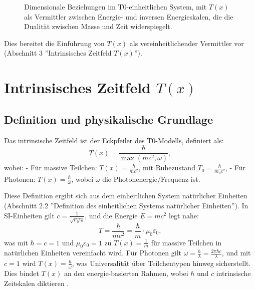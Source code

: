 \documentclass[12pt,a4paper]{article}
\newcommand{\Tfield}{T(x)}
\newcommand{\Tzero}{T_0}
\begin{document}
	\begin{figure}[ht]
		\centering
		\caption{Dimensionale Beziehungen im T0-einheitlichen System, mit \(\Tfield\) als Vermittler zwischen Energie- und inversen Energieskalen, die die Dualität zwischen Masse und Zeit widerspiegelt.}
		\label{fig:dimensions}
	\end{figure}
	
	Dies bereitet die Einführung von \(\Tfield\) als vereinheitlichender Vermittler vor (Abschnitt 3 ''Intrinsisches Zeitfeld \(\Tfield\)'').
	
	\section{Intrinsisches Zeitfeld \(\Tfield\)}
	\label{sec:intrinsic_time}
	
	\subsection{Definition und physikalische Grundlage}
	\label{subsec:time_definition}
	
	Das intrinsische Zeitfeld ist der Eckpfeiler des T0-Modells, definiert als:
	\begin{equation}
		\Tfield = \frac{\hbar}{\max(mc^2, \omega)},
		\label{eq:intrinsic_time}
	\end{equation}
	wobei:
	- Für massive Teilchen: \(\Tfield = \frac{\hbar}{mc^2}\), mit Ruhezustand \(\Tzero = \frac{\hbar}{m_0 c^2}\),
	- Für Photonen: \(\Tfield = \frac{\hbar}{\omega}\), wobei \(\omega\) die Photonenergie/Frequenz ist.
	
	Diese Definition ergibt sich aus dem einheitlichen System natürlicher Einheiten (Abschnitt 2.2 ''Definition des einheitlichen Systems natürlicher Einheiten''). In SI-Einheiten gilt \(c = \frac{1}{\sqrt{\mu_0\varepsilon_0}}\), und die Energie \(E = mc^2\) legt nahe:
	\begin{equation}
		T = \frac{\hbar}{mc^2} = \frac{\hbar}{m} \cdot \mu_0\varepsilon_0,
		\label{eq:time_em}
	\end{equation}
	was mit \(\hbar = c = 1\) und \(\mu_0\varepsilon_0 = 1\) zu \(\Tfield = \frac{1}{m}\) für massive Teilchen in natürlichen Einheiten vereinfacht wird. Für Photonen gilt \(\omega = \frac{h}{\lambda} = \frac{2\pi\hbar c}{\lambda}\), und mit \(c = 1\) wird \(\Tfield = \frac{\hbar}{\omega}\), was Universalität über Teilchentypen hinweg sicherstellt. Dies bindet \(\Tfield\) an den energie-basierten Rahmen, wobei \(\hbar\) und \(c\) intrinsische Zeitskalen diktieren \cite{pascher_lagrange_2025}.
	
\end{document}
